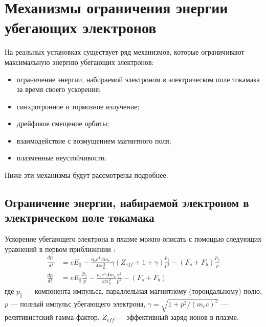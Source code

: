 
\section{Механизмы ограничения энергии убегающих электронов}

На реальных установках существует ряд механизмов, которые ограничивают максимальную энергию убегающих электронов: 

\begin{itemize}
  \item ограничение энергии, набираемой электроном в электрическом поле токамака за время своего ускорения;
  \item синхротронное и тормозное излучение;
  \item дрейфовое смещение орбиты;
  \item взаимодействие с возмущением магнитного поля;
  \item плазменные неустойчивости.
\end{itemize}

Ниже эти механизмы будут рассмотрены подробнее.


\subsection{Ограничение энергии, набираемой электроном в электрическом поле токамака}

Ускорение убегающего электрона в плазме можно описать с помощью следующих уравнений в первом приближении \cite{MartinSolis1998,Bakhtiari2005}:
\begin{equation}
  \label{eq:AccelerationRunaways}
  \begin{alignedat}{1}
    \frac{ d p_{\parallel} }{ d t } & = e E_{\parallel} - \frac{ n_c e^4 \Lambda m_e }{ 4 \pi \epsilon_0^2 } \gamma ( Z_{eff} + 1 + \gamma ) \frac{ p_{\parallel} }{ p^3 } - ( F_s + F_b ) \frac{ p_{\parallel} }{ p }   \\
    \frac{ d p }{ d t } & = e E_{\parallel} \frac{ p_{\parallel} }{ p } - \frac{ n_c e^4 \Lambda m_e }{ 4 \pi \epsilon_0^2 } \frac{ \gamma^2 }{ p^2 } - ( F_s + F_b )
  \end{alignedat}  
\end{equation}
где $ p_{\parallel} $ --- компонента импульса, параллельная магнитному (тороидальному) полю, $p$ --- полный импульс убегающего электрона, $\gamma = \sqrt{ 1 + p^2 / ( m_e c )^2 }$ --- релятивистский гамма-фактор, $Z_{eff}$ --- эффективный заряд ионов в плазме. 

